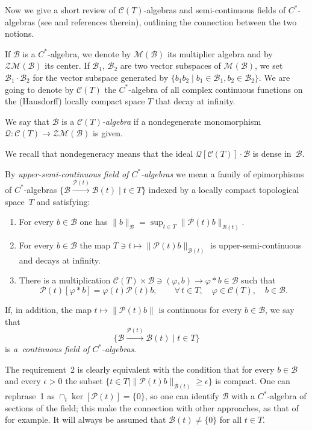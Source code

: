 \documentclass[11pt]{article}
\def\C{\mathcal{C}}
\def\B{{\mathcal B}}
\def\Q{\mathcal Q}
\def\P{\mathcal P}
\begin{document}
Now we give a short review of $\C(T)$-algebras and semi-continuous f\/ields of $C^*$-algebras
(see \cite{Bl,La,Lee,Ni,Rie,Wi} and references therein), outlining the connection between the two notions.

If $\B$ is a $C^*$-algebra, we denote by $\mathcal M(\B)$ its multiplier algebra and by $\mathcal Z\mathcal M(\B)$ its center.
If $\mathcal B_1$, $\mathcal B_2$ are two vector subspaces of $\mathcal M(\B)$, we set $\B_1\cdot\B_2$ for the vector
subspace generated by $\{b_1 b_2\mid b_1\in\B_1,b_2\in\B_2\}$.
We are going to denote by $\C(T)$ the $C^*$-algebra of all complex continuous functions on the (Hausdorf\/f)
locally compact space $T$ that decay at inf\/inity.

\begin{Definition}\label{cedete}
We say that $\B$ is a {\it $\C(T)$-algebra}
if a nondegenerate monomorphism $\Q:\C(T)\rightarrow\mathcal Z\mathcal M(\B)$ is given.
\end{Definition}

We recall that nondegeneracy means that the ideal $\Q[\C(T)]\cdot\B$
is dense in~$\B$.

\begin{Definition}\label{niulaif}
By {\it upper-semi-continuous field of $C^*$-algebras} we mean a family of epimorphisms of $C^*$-algebras
$\big\{\mathcal B\overset{\P(t)}{\longrightarrow}\mathcal B(t)\mid t\in T\big\}$
indexed by a locally compact topological space~$T$ and satisfying:
\begin{enumerate}\itemsep=0pt
\item
For every $b\in\B$ one has $\| b\|_\B=\sup_{t\in T}\| \P(t)b\|_{\B(t)}$.
\item
For every $b\in\B$ the map
$T\ni t\mapsto\| \P(t)b\|_{\B(t)}$ is upper-semi-continuous and decays at inf\/inity.
\item
There is a multiplication $\C(T)\times\B\ni(\varphi,b)\rightarrow\varphi\ast b\in\B$ such that
\[
\P(t)[\varphi\ast b]=\varphi(t) \P(t)b ,\qquad \forall\,t\in T,\quad \varphi\in\C(T) ,\quad  b\in\B .
\]
\end{enumerate}
If, in addition, the map $t\mapsto\| \P(t)b\| $ is continuous for every $b\in \B$, we say that
\[
\big\{\mathcal B\overset{\P(t)}{\longrightarrow}\mathcal B(t)\mid t\in T\big\}
\] is {\it a~continuous field of
$C^*$-algebras}.
\end{Definition}

The requirement~2 is clearly equivalent with the condition that
for every $b\in\B$ and every $\epsilon>0$ the subset $\{t\in T\mid\| \P(t)b\|_{\B(t)}\ge \epsilon\}$  is compact.
One can rephrase~1 as $\cap_t\ker[\P(t)]=\{0\}$,
so one can identify $\B$ with a $C^*$-algebra of sections of the f\/ield; this make the connection with other approaches,
as that of~\cite{Ni} for example. It will always be assumed that $\B(t)\ne\{0\}$ for all $t\in T$.
\end{document}
